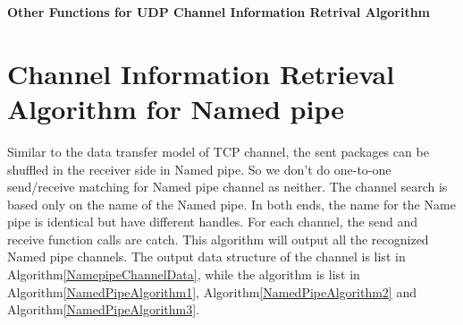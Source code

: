 \begin{algorithm}[H]
\DontPrintSemicolon
\caption{{\bf Other Functions for UDP Channel Information Retrival Algorithm} \label{UDPAlgorithm2}} 
  
\end{algorithm}

\section{Channel Information Retrieval Algorithm for Named pipe}
Similar to the data transfer model of TCP channel, the sent packages can be shuffled in the receiver side in Named pipe. So we don't do one-to-one send/receive matching for Named pipe channel as neither. The channel search is based only on the name of the Named pipe. In both ends, the name for the Name pipe is identical but have different handles. For each channel, the send and receive function calls are catch. This algorithm will output all the recognized Named pipe channels. The output data structure of the channel is list in Algorithm\ref{NamepipeChannelData}, while the algorithm is list in Algorithm\ref{NamedPipeAlgorithm1}, Algorithm\ref{NamedPipeAlgorithm2} and Algorithm\ref{NamedPipeAlgorithm3}.

